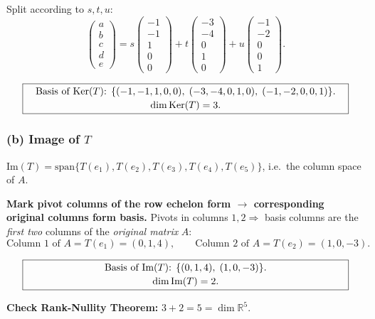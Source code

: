 \documentclass[a4paper,12pt]{article}
\begin{document}
Split according to $s, t, u$:
\[
\begin{pmatrix} a \\ b \\ c \\ d \\ e \end{pmatrix}
= s \begin{pmatrix} -1 \\ -1 \\ 1 \\ 0 \\ 0 \end{pmatrix}
+ t \begin{pmatrix} -3 \\ -4 \\ 0 \\ 1 \\ 0 \end{pmatrix}
+ u \begin{pmatrix} -1 \\ -2 \\ 0 \\ 0 \\ 1 \end{pmatrix}.
\]

\[
\fbox{\parbox{0.93\textwidth}{\centering
Basis of $\text{Ker}(T)$: $\{(-1,-1,1,0,0),\;(-3,-4,0,1,0),\;(-1,-2,0,0,1)\}$. \\[2pt]
$\dim \text{Ker}(T) = 3.$
}}
\]

\subsubsection*{(b) Image of $T$}

$\text{Im}(T) = \text{span}\{T(e_1), T(e_2), T(e_3), T(e_4), T(e_5)\}$, i.e.\ the column space of $A$.

\textbf{Mark pivot columns of the row echelon form $\to$ corresponding original columns form basis.} Pivots in columns $1, 2 \Rightarrow$ basis columns are the \emph{first two} columns of the \emph{original matrix} $A$:
\[
\text{Column 1 of } A = T(e_1) = (0, 1, 4),\qquad
\text{Column 2 of } A = T(e_2) = (1, 0, -3).
\]

\[
\fbox{\parbox{0.93\textwidth}{\centering
Basis of $\text{Im}(T)$: $\{(0, 1, 4),\;(1, 0, -3)\}$. \\[2pt]
$\dim \text{Im}(T) = 2.$
}}
\]

\textbf{Check Rank-Nullity Theorem:} $3 + 2 = 5 = \dim \mathbb{R}^5$. \checkmark
\end{document}
